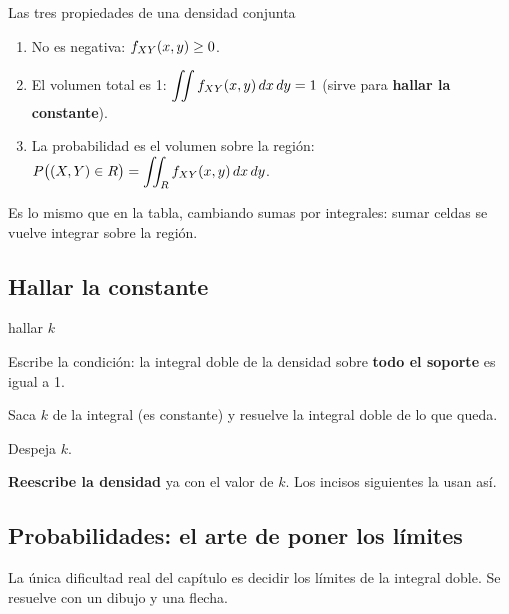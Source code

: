\begin{idea}{Las tres propiedades de una densidad conjunta}
\begin{enumerate}[label=\protect\circnum{\arabic*},leftmargin=10mm,labelsep=3mm]
\item No es negativa: \quad $f_{XY}(x,y)\ge0$.
\item El volumen total es 1: \quad $\displaystyle\iint f_{XY}(x,y)\,dx\,dy=1$ \quad (sirve para \textbf{hallar la constante}).
\item La probabilidad es el volumen sobre la regi\'on: \quad $\displaystyle P\big((X,Y)\in R\big)=\iint_Rf_{XY}(x,y)\,dx\,dy$.
\end{enumerate}
Es lo mismo que en la tabla, cambiando sumas por integrales: \guillemotleft sumar celdas\guillemotright{} se vuelve \guillemotleft integrar sobre la regi\'on\guillemotright.
\end{idea}



\subsection{Hallar la constante}

\begin{receta}{hallar $k$}
\begin{pasosreceta}
\item Escribe la condici\'on: la integral doble de la densidad sobre \textbf{todo el soporte} es igual a 1.
\item Saca $k$ de la integral (es constante) y resuelve la integral doble de lo que queda.
\item Despeja $k$.
\item \textbf{Reescribe la densidad} ya con el valor de $k$. Los incisos siguientes la usan as\'i.
\end{pasosreceta}
\end{receta}

\subsection{Probabilidades: el arte de poner los l\'imites}

La \'unica dificultad real del cap\'itulo es decidir los l\'imites de la integral doble. Se resuelve con un dibujo y una flecha.

